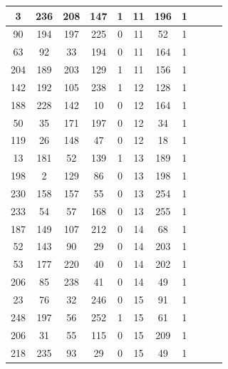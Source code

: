 \documentclass[12pt]{jreport}
\begin{document}
\begin{table}[htb]
\begin{center}
\begin{tabular} {|c|c|c|c|c|c|c|c|c|c|c|}
                        3 & 236 & 208 & 147 & 1 & 11 & 196 & 1 \\ \hline
                        90 & 194 & 197 & 225 & 0 & 11 & 52 & 1 \\ \hline
                        63 & 92 & 33 & 194 & 0 & 11 & 164 & 1 \\ \hline
                        204 & 189 & 203 & 129 & 1 & 11 & 156 & 1 \\ \hline

                        142 & 192 & 105 & 238 & 1 & 12 & 128 & 1 \\ \hline
                        188 & 228 & 142 & 10 & 0 & 12 & 164 & 1 \\ \hline
                        50 & 35 & 171 & 197 & 0 & 12 & 34 & 1 \\ \hline
                        119 & 26 & 148 & 47 & 0 & 12 & 18 & 1 \\ \hline

                        13 & 181 & 52 & 139 & 1 & 13 & 189 & 1 \\ \hline
                        198 & 2 & 129 & 86 & 0 & 13 & 198 & 1 \\ \hline
                        230 & 158 & 157 & 55 & 0 & 13 & 254 & 1 \\ \hline
                        233 & 54 & 57 & 168 & 0 & 13 & 255 & 1 \\ \hline

                        187 & 149 & 107 & 212 & 0 & 14 & 68 & 1 \\ \hline
                        52 & 143 & 90 & 29 & 0 & 14 & 203 & 1 \\ \hline
                        53 & 177 & 220 & 40 & 0 & 14 & 202 & 1 \\ \hline
                        206 & 85 & 238 & 41 & 0 & 14 & 49 & 1 \\ \hline

                        23 & 76 & 32 & 246 & 0 & 15 & 91 & 1 \\ \hline
                        248 & 197 & 56 & 252 & 1 & 15 & 61 & 1 \\ \hline
                        206 & 31 & 55 & 115 & 0 & 15 & 209 & 1 \\ \hline
                        218 & 235 & 93 & 29 & 0 & 15 & 49 & 1 \\ \hline
                \end{tabular}
              \end{center}
            \end{table}
\end{document}
